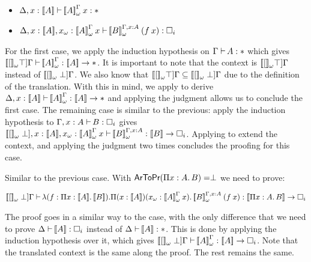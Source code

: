 \begin{Proof}
\begin{ProofCase}{\CicPropProd}
\begin{itemize}
\item $\ctyping[][\varContext,\typing{x}{\TypeTrans{A}}]{\app{\WParamTypeTrans{A}}{x}}{\Prop}$
\item $\ctyping[][\varContext,\typing{x}{\TypeTrans{A}},\typing{\WTermTrans{x}}{\app{\WParamTypeTrans{A}}{x}}]{
                  \app{\WParamTypeTrans[\Context,\typing{x}{A}]{B}}{(\app{f}{x})}}{
                  \Type}$
\end{itemize}
For the first case, we apply the induction hypothesis on $\ctyping{A}{\Prop}$ which gives
$\ctyping[\WContextTrans[\True]{\Context}][]{\WParamTypeTrans{A}}{\arrow{\TypeTrans{A}}{\Prop}}$.
It is important to note that
the context is $\WContextTrans[\True]{\Context}$ instead of $\WContextTrans[\False]{\Context}$. We also 
know that $\WContextTrans[\True]{\Context} \subseteq \WContextTrans[\False]{\Context}$ due to the
definition of the translation. With this in mind, we apply 
to derive 
$\ctyping[\varContext,\typing{x}{\TypeTrans{A}}][]{\WParamTypeTrans{A}}{\arrow{\TypeTrans{A}}{\Prop}}$
and applying the \CicApp{} judgment allows us to conclude the first case. The remaining case is similar to the 
previous: apply the induction hypothesis to $\ctyping[\typing{x}{A}]{B}{\Type}$ gives 
$\ctyping[][\WContextTrans[\False],\typing{x}{\TypeTrans{A}},\typing{\WTermTrans{x}}{\app{\WParamTypeTrans{A}}{x}}]{
        \WParamTypeTrans[\Context,\typing{x}{A}]{B}}{\arrow{\TypeTrans{B}}{\Type}}$.
Applying  to extend the context, and applying the \CicApp{} judgment two times 
concludes the proofing for this case.
\end{ProofCase}

\begin{ProofCase}{\CicTypeProd}
Similar to the previous case. With $\propFun[\depArrow{x}{A}{B}]\termEq\False$ we need to prove:
\begin{center}
$\ctyping[][\WContextTrans[\False]{\Context}]{%
           \varabs{f}{\depArrow{x}{\TypeTrans{A}}{\TypeTrans{B}}}{%
                  \depArrow{x}{\TypeTrans{A}}{\WTermTrans{x}}{\app{\WParamTypeTrans{A}}{x}}{
                            \app{\WParamTypeTrans[\Context,\typing{x}{A}]{B}}{(\app{f}{x})}}}}{%
           \arrow{\TypeTrans{\depArrow{x}{A}{B}}}{\Type}}
$
\end{center}
The proof goes in a similar way to the \CicPropProd{} case, with the only difference that we need to prove
$\ctyping[][\varContext]{\TypeTrans{A}}{\Type}$
instead of 
$\ctyping[][\varContext]{\TypeTrans{A}}{\Prop}$.
This is done by applying the induction hypothesis over it, which gives 
$\ctyping[\WContextTrans[\False]{\Context}][]{\WParamTypeTrans{A}}{\arrow{\TypeTrans{A}}{\Type}}$. Note
that the translated context is the same along the proof. The rest remains the same.
\end{ProofCase}


\end{Proof}
